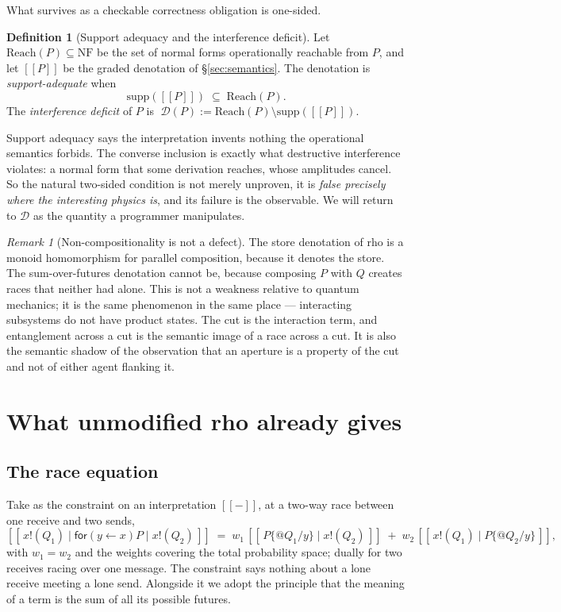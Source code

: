 \documentclass[11pt,a4paper]{article}
\theoremstyle{plain}
\theoremstyle{definition}
\newtheorem{definition}[theorem]{Definition}
\theoremstyle{remark}
\newtheorem{remark}[theorem]{Remark}
\newcommand{\sem}[1]{[\![#1]\!]}
\newcommand{\NF}{\mathrm{NF}}
\newcommand{\Reach}{\mathrm{Reach}}
\newcommand{\supp}{\mathrm{supp}}
\begin{document}
What survives as a checkable correctness obligation is one-sided.

\begin{definition}[Support adequacy and the interference deficit]\label{def:deficit}
Let $\Reach(P) \subseteq \NF$ be the set of normal forms operationally reachable
from $P$, and let $\sem{P}$ be the graded denotation of \S\ref{sec:semantics}.
The denotation is \emph{support-adequate} when
\[
  \supp(\sem{P}) \;\subseteq\; \Reach(P).
\]
The \emph{interference deficit} of $P$ is
$\;\mathcal{D}(P) := \Reach(P)\setminus\supp(\sem{P})$.
\end{definition}

Support adequacy says the interpretation invents nothing the operational
semantics forbids. The converse inclusion is exactly what destructive
interference violates: a normal form that some derivation reaches, whose
amplitudes cancel. So the natural two-sided condition is not merely unproven, it
is \emph{false precisely where the interesting physics is}, and its failure is
the observable. We will return to $\mathcal{D}$ as the quantity a programmer
manipulates.

\begin{remark}[Non-compositionality is not a defect]\label{rem:compositional}
The store denotation of rho is a monoid homomorphism for parallel composition,
because it denotes the store. The sum-over-futures denotation cannot be, because
composing $P$ with $Q$ creates races that neither had alone. This is not a
weakness relative to quantum mechanics; it is the same phenomenon in the same
place --- interacting subsystems do not have product states. The cut is the
interaction term, and entanglement across a cut is the semantic image of a race
across a cut. It is also the semantic shadow of the observation that an aperture
is a property of the cut and not of either agent flanking it.
\end{remark}

\section{What unmodified rho already gives}\label{sec:stage1}

\subsection{The race equation}

Take as the constraint on an interpretation $\sem{-}$, at a two-way race between
one receive and two sends,
\begin{equation}\label{eq:race}
  \sem{\,x!(Q_1) \mid \textsf{for}(y \leftarrow x)P \mid x!(Q_2)\,}
  \;=\;
  w_1\,\sem{\,P\{@Q_1/y\} \mid x!(Q_2)\,}
  \;+\;
  w_2\,\sem{\,x!(Q_1) \mid P\{@Q_2/y\}\,},
\end{equation}
with $w_1 = w_2$ and the weights covering the total probability space; dually for
two receives racing over one message. The constraint says nothing about a lone
receive meeting a lone send. Alongside it we adopt the principle that the meaning
of a term is the sum of all its possible futures.
\end{document}
